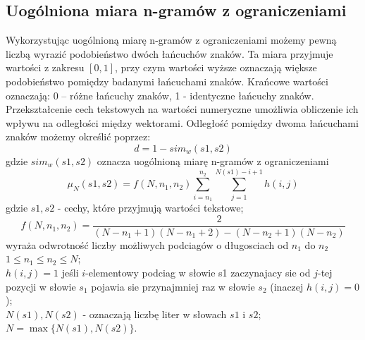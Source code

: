 \documentclass{article}
\begin{document}
\subsection{Uogólniona miara n-gramów z ograniczeniami}
Wykorzystując uogólnioną miarę n-gramów z ograniczeniami możemy pewną liczbą wyrazić podobieństwo dwóch łańcuchów znaków. Ta miara przyjmuje wartości z zakresu \([0,1]\), przy czym wartości wyższe oznaczają większe podobieństwo pomiędzy badanymi łańcuchami znaków. Krańcowe wartości oznaczają: 0 – różne łańcuchy znaków, 1 - identyczne łańcuchy znaków. Przekształcenie cech tekstowych na wartości numeryczne umożliwia obliczenie ich wpływu na odległości między wektorami. Odległość pomiędzy dwoma łańcuchami znaków możemy określić poprzez:
\begin{equation}
    d = 1 - sim_w(s1, s2)
\end{equation}
gdzie \(sim_w(s1,s2)\) oznacza uogólnioną miarę n-gramów z ograniczeniami
\begin{equation}
    \mu_N(s1, s2) = f(N, n_1, n_2) \sum_{i=n_1}^{n_2} \sum_{j=1}^{N(s1) - i + 1} h(i, j)
\end{equation}
gdzie \( s1, s2\) - cechy, które przyjmują wartości tekstowe;
\begin{equation} 
f(N, n_1, n_2) = \frac{2}{(N - n_1 + 1)(N - n_1 + 2) - (N - n_2 + 1)(N - n_2)}
\end{equation}
wyraża odwrotność liczby możliwych podciagów o długosciach od \(n_1\) do \(n_2\)
\(1 \leq n_1 \leq n_2 \leq N\); \\
\(h(i,j) = 1\) jeśli \(i\)-elementowy podciag w słowie s1 zaczynajacy sie od \(j\)-tej
pozycji w słowie \(s_1\) pojawia sie przynajmniej raz w słowie \(s_2\) (inaczej
\(h(i,j) = 0\));\\
\(N(s1), N(s2)\) - oznaczają liczbę liter w słowach \( s1\) i \(s2\);\\
\(N = \max \{N(s1), N(s2)\}\).\\
\end{document}

